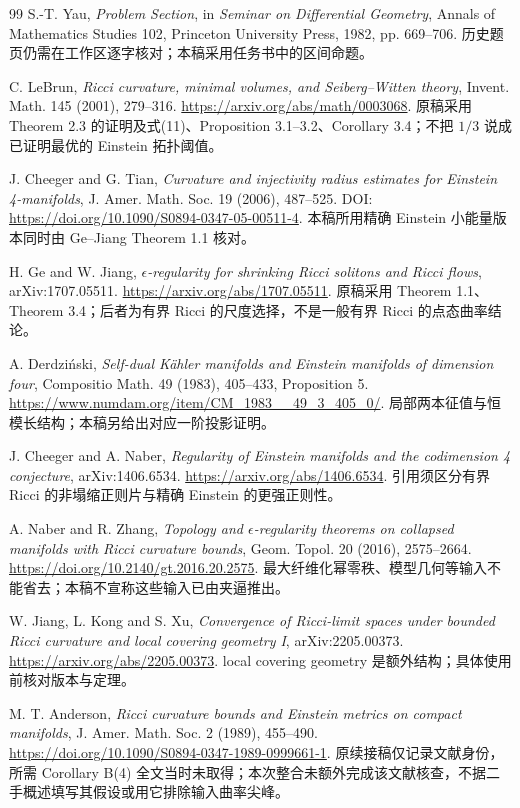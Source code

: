 \documentclass[UTF8,a4paper,11pt,fontset=fandol]{ctexart}
\numberwithin{equation}{section}
\theoremstyle{definition}
\begin{document}
\begin{thebibliography}{99}
 S.-T. Yau, \emph{Problem Section}, in \emph{Seminar on Differential Geometry}, Annals of Mathematics Studies 102, Princeton University Press, 1982, pp. 669--706. 历史题页仍需在工作区逐字核对；本稿采用任务书中的区间命题。

 C. LeBrun, \emph{Ricci curvature, minimal volumes, and Seiberg--Witten theory}, Invent. Math. 145 (2001), 279--316. \url{https://arxiv.org/abs/math/0003068}. 原稿采用 Theorem 2.3 的证明及式(11)、Proposition 3.1--3.2、Corollary 3.4；不把 $1/3$ 说成已证明最优的 Einstein 拓扑阈值。

 J. Cheeger and G. Tian, \emph{Curvature and injectivity radius estimates for Einstein 4-manifolds}, J. Amer. Math. Soc. 19 (2006), 487--525. DOI: \url{https://doi.org/10.1090/S0894-0347-05-00511-4}. 本稿所用精确 Einstein 小能量版本同时由 Ge--Jiang Theorem 1.1 核对。

 H. Ge and W. Jiang, \emph{$\epsilon$-regularity for shrinking Ricci solitons and Ricci flows}, arXiv:1707.05511. \url{https://arxiv.org/abs/1707.05511}. 原稿采用 Theorem 1.1、Theorem 3.4；后者为有界 Ricci 的尺度选择，不是一般有界 Ricci 的点态曲率结论。

 A. Derdzi\'nski, \emph{Self-dual K\"ahler manifolds and Einstein manifolds of dimension four}, Compositio Math. 49 (1983), 405--433, Proposition 5. \url{https://www.numdam.org/item/CM_1983__49_3_405_0/}. 局部两本征值与恒模长结构；本稿另给出对应一阶投影证明。

 J. Cheeger and A. Naber, \emph{Regularity of Einstein manifolds and the codimension 4 conjecture}, arXiv:1406.6534. \url{https://arxiv.org/abs/1406.6534}. 引用须区分有界 Ricci 的非塌缩正则片与精确 Einstein 的更强正则性。

 A. Naber and R. Zhang, \emph{Topology and $\epsilon$-regularity theorems on collapsed manifolds with Ricci curvature bounds}, Geom. Topol. 20 (2016), 2575--2664. \url{https://doi.org/10.2140/gt.2016.20.2575}. 最大纤维化幂零秩、模型几何等输入不能省去；本稿不宣称这些输入已由夹逼推出。

 W. Jiang, L. Kong and S. Xu, \emph{Convergence of Ricci-limit spaces under bounded Ricci curvature and local covering geometry I}, arXiv:2205.00373. \url{https://arxiv.org/abs/2205.00373}. local covering geometry 是额外结构；具体使用前核对版本与定理。

 M. T. Anderson, \emph{Ricci curvature bounds and Einstein metrics on compact manifolds}, J. Amer. Math. Soc. 2 (1989), 455--490. \url{https://doi.org/10.1090/S0894-0347-1989-0999661-1}. 原续接稿仅记录文献身份，所需 Corollary B(4) 全文当时未取得；本次整合未额外完成该文献核查，不据二手概述填写其假设或用它排除输入曲率尖峰。


\end{thebibliography}
\end{document}
